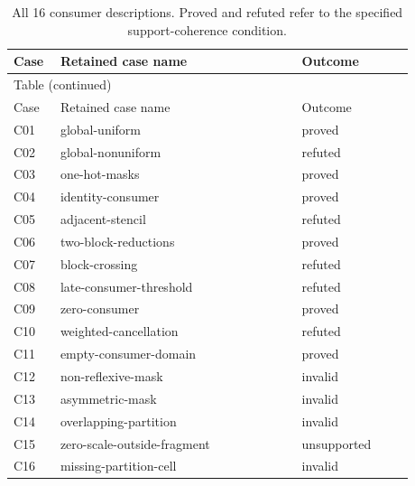 \begin{longtable}{@{}p{0.09\linewidth}p{0.54\linewidth}p{0.25\linewidth}@{}}
\caption{All 16 consumer descriptions. Proved and refuted refer to the specified support-coherence condition.}\label{tab:consumer-catalog}\\
\toprule Case & Retained case name & Outcome\\\midrule\endfirsthead
\multicolumn{3}{l}{Table \thetable{} (continued)}\\
\toprule Case & Retained case name & Outcome\\\midrule\endhead
\bottomrule\endfoot
C01 & global-uniform & proved\\
C02 & global-nonuniform & refuted\\
C03 & one-hot-masks & proved\\
C04 & identity-consumer & proved\\
C05 & adjacent-stencil & refuted\\
C06 & two-block-reductions & proved\\
C07 & block-crossing & refuted\\
C08 & late-consumer-threshold & refuted\\
C09 & zero-consumer & proved\\
C10 & weighted-cancellation & refuted\\
C11 & empty-consumer-domain & proved\\
C12 & non-reflexive-mask & invalid\\
C13 & asymmetric-mask & invalid\\
C14 & overlapping-partition & invalid\\
C15 & zero-scale-outside-fragment & unsupported\\
C16 & missing-partition-cell & invalid\\
\end{longtable}
